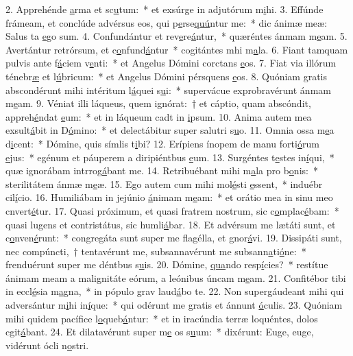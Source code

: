 2. Apprehénde \uline{a}rma et sc\uline{u}tum:~* et exsúrge in adjutórum m\uline{i}hi.
3. Effúnde frámeam, et conclúde advérsus eos, qui p\uline{e}rse\uline{quú}ntur me:~* dic ánimæ meæ: Salus ta \uline{e}go sum.
4. Confundántur et rev\uline{e}re\uline{á}ntur,~* quæréntes ánmam m\uline{e}am.
5. Avertántur retrórsum, et c\uline{o}nfund\uline{á}ntur~* cogitántes mhi m\uline{a}la.
6. Fiant tamquam pulvis ante f\uline{á}ciem v\uline{e}nti:~* et Angelus Dómini corctans \uline{e}os.
7. Fiat via illórum ténebr\uline{æ} et l\uline{ú}bricum:~* et Angelus Dómini pérsquens \uline{e}os.
8. Quóniam gratis abscondérunt mihi intéritum l\uline{á}quei s\uline{u}i:~* supervácue exprobravérunt ánmam m\uline{e}am.
9. Véniat illi láqueus, quem ignórat:~† et cáptio, quam abscóndit, appreh\uline{é}ndat \uline{e}um:~* et in láqueum cadt in \uline{i}psum.
10. Anima autem mea exsult\uline{á}bit in D\uline{ó}mino:~* et delectábitur super salutri s\uline{u}o.
11. Omnia ossa m\uline{e}a d\uline{i}cent:~* Dómine, quis símlis t\uline{i}bi?
12. Erípiens ínopem de manu forti\uline{ó}rum \uline{e}jus:~* egénum et páuperem a diripiéntbus \uline{e}um.
13. Surgéntes t\uline{e}stes in\uline{í}qui,~* quæ ignorábam intrrog\uline{á}bant me.
14. Retribuébant mihi m\uline{a}la pro b\uline{o}nis:~* sterilitátem ánmæ m\uline{e}æ.
15. Ego autem cum mihi mol\uline{é}sti \uline{e}ssent,~* induébr cil\uline{í}cio.
16. Humiliábam in jejúnio \uline{á}nimam m\uline{e}am:~* et orátio mea in sinu meo cnvert\uline{é}tur.
17. Quasi próximum, et quasi fratrem nostrum, sic c\uline{o}mplac\uline{é}bam:~* quasi lugens et contristátus, sic humli\uline{á}bar.
18. Et advérsum me lætáti sunt, et c\uline{o}nven\uline{é}runt:~* congregáta sunt super me flagélla, et gnor\uline{á}vi.
19. Dissipáti sunt, nec compúncti,~† tentavérunt me, subsannavérunt me subsann\uline{a}ti\uline{ó}ne:~* frenduérunt super me déntbus s\uline{u}is.
20. Dómine, \uline{qua}ndo resp\uline{í}cies?~* restítue ánimam meam a malignitáte eórum, a leónibus úncam m\uline{e}am.
21. Confitébor tibi in eccl\uline{é}sia m\uline{a}gna,~* in pópulo grav laud\uline{á}bo te.
22. Non supergáudeant mihi qui adversántur m\uline{i}hi in\uline{í}que:~* qui odérunt me gratis et ánnunt \uline{ó}culis.
23. Quóniam mihi quidem pacífice l\uline{o}queb\uline{á}ntur:~* et in iracúndia terræ loquéntes, dolos cgit\uline{á}bant.
24. Et dilatavérunt super m\uline{e} os s\uline{u}um:~* dixérunt: Euge, euge, vidérunt ócli n\uline{o}stri.
